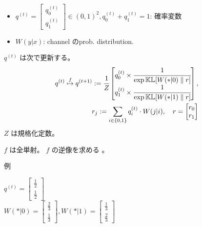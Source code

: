 \begin{itemize}

	\item $ q^{(t)} = \begin{bmatrix} q_0^{(t)} \\ q_1^{(t)} \end{bmatrix} 
			\in (0,1)^2 , q_0^{(t)} + q_1^{(t)} = 1$: 確率変数
	\item $W (y | x)$: channel のprob. distribution.
\end{itemize}

$q^{(t)}$ は次で更新する。
\begin{align}
	q^{(t)} \overset{f}{\mapsto}
	q^{(t+1)} := \cfrac{1}{Z} \begin{bmatrix}
		q_0^{(t)} \times \cfrac{1}{\exp  \mathbb{KL} [W (\ast | 0) \parallel r ]} \\
		q_1^{(t)} \times \cfrac{1}{\exp \mathbb{KL} [W (\ast | 1) \parallel r]}
	\end{bmatrix}
	,\\
	r_j := \sum_{i\in\{0,1\}} q^{(t)}_i \cdot W (j | i),
	\quad
	r = \begin{bmatrix} r_0 \\ r_1 \end{bmatrix}
\end{align}
$Z$ は規格化定数。

$f$ は全単射。
$f$ の逆像を求める
。



例

$q^{(t)} = \begin{bmatrix} \frac{1}{2} \\ \frac{1}{2} \end{bmatrix}$ \\

	$W (\ast | 0) = \begin{bmatrix} \frac{2}{3} \\ \frac{1}{3} \end{bmatrix},
	W (\ast | 1) = \begin{bmatrix} \frac{1}{3} \\ \frac{2}{3} \end{bmatrix}$

\begin{center}
\end{center}

